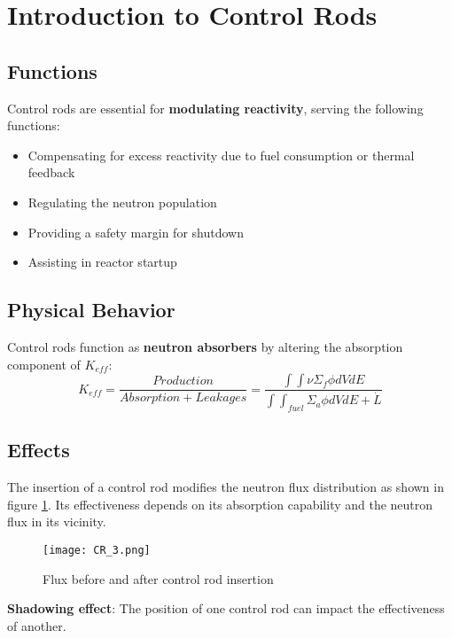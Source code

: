 \section{Introduction to Control Rods}

\subsection{Functions}
Control rods are essential for \textbf{modulating reactivity}, serving the following functions:
\begin{itemize}
    \item Compensating for excess reactivity due to fuel consumption or thermal feedback
    \item Regulating the neutron population
    \item Providing a safety margin for shutdown
    \item Assisting in reactor startup
\end{itemize}

\subsection{Physical Behavior}
Control rods function as \textbf{neutron absorbers} by altering the absorption component of $K_{eff}$:
\begin{equation}
    K_{eff} = \frac{Production}{Absorption + Leakages} = \frac{\int \int \nu \Sigma_f \phi dV dE}{\int \int _{fuel} \Sigma_a \phi dV dE + \dot{L}}
\end{equation}

\subsection{Effects}
The insertion of a control rod modifies the neutron flux distribution as shown in figure \ref{fig:flux_depression_cr_insertion}. Its effectiveness depends on its absorption capability and the neutron flux in its vicinity.
\begin{figure}[H]
    \centering
    \texttt{[image: CR\_3.png]}
    \caption{Flux before and after control rod insertion}
    \label{fig:flux_depression_cr_insertion}
\end{figure}

\textbf{Shadowing effect}: The position of one control rod can impact the effectiveness of another.


